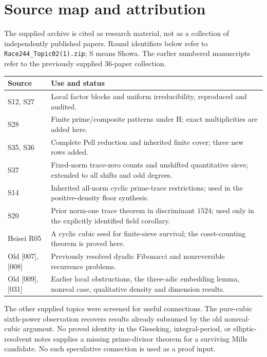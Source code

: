 \documentclass[11pt,a4paper]{article}
\theoremstyle{remark}\newtheorem{remark}[theorem]{Remark}
\begin{document}
\section{Source map and attribution}
The supplied archive is cited as research material, not as a collection
of independently published papers. Round identifiers below refer to
\texttt{Race244\_Topic02(1).zip}; S means Showa. The earlier numbered
manuscripts refer to the previously supplied 36-paper collection.
\begin{center}\small
\begin{tabular}{p{}p{}}
\toprule
Source & Use and status\\\midrule
S12, S27 & Local factor blocks and uniform irreducibility, reproduced and audited.\\
S28 & Finite prime/composite patterns under H; exact multiplicities are added here.\\
S35, S36 & Complete Pell reduction and inherited finite cover; three new rows added.\\
S37 & Fixed-norm trace-zero counts and unshifted quantitative sieve; extended to all shifts and odd degrees.\\
S14 & Inherited all-norm cyclic prime-trace restrictions; used in the positive-density floor synthesis.\\
S20 & Prior norm-one trace theorem in discriminant $1524$; used only in the explicitly identified field corollary.\\
Heisei R05 & A cyclic cubic seed for finite-sieve survival; the coset-counting theorem is proved here.\\
Old [007], [008] & Previously resolved dyadic Fibonacci and nonreversible recurrence problems.\\
Old [009], [031] & Earlier local obstructions, the three-adic embedding lemma, nonreal case, qualitative density and dimension results.\\
\bottomrule
\end{tabular}
\end{center}
The other supplied topics were screened for useful connections.
The pure-cubic sixth-power observation recovers results already
subsumed by the old nonreal-cubic argument. No proved identity in
the Gieseking, integral-period, or elliptic-resolvent notes supplies
a missing prime-divisor theorem for a surviving Mills candidate.
No such speculative connection is used as a proof input.
\end{document}
